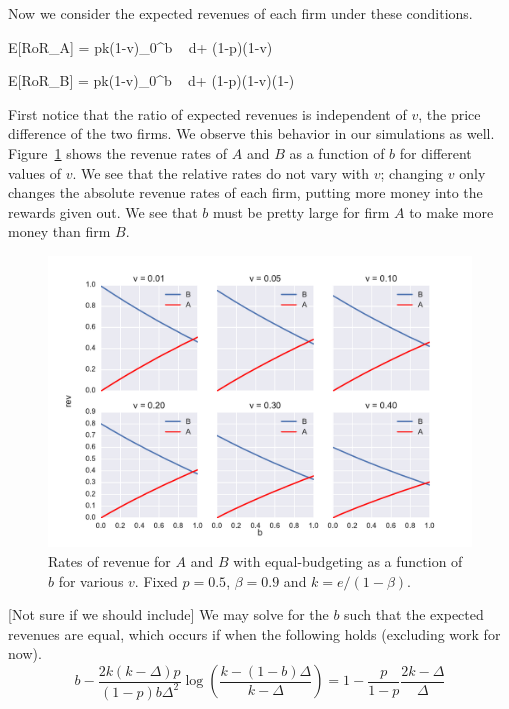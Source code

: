 Now we consider the expected revenues of each firm under these conditions.

\beq
{}E[RoR_A] = pk(1-v)\int_0^b  \mbox{ } d\lambda + (1-p)(1-v)
\eeq

\beq
{}E[RoR_B] = pk(1-v)\int_0^b  \mbox{ } d\lambda + (1-p)(1-v)\left(1-\right)
\eeq

First notice that the ratio of expected revenues is independent of $v$, the price difference of the two firms. We observe this behavior in our simulations as well. Figure~\ref{fig:eq_budg_vary_v} shows the revenue rates of $A$ and $B$ as a function of $b$ for different values of $v$. We see that the relative rates do not vary with $v$; changing $v$ only changes the absolute revenue rates of each firm, putting more money into the rewards given out. We see that $b$ must be pretty large for firm $A$ to make more money than firm $B$. 

\begin{figure}[h!]
\begin{centering}
\includegraphics[scale = 0.75]{./figures/eq_budg_vary_v_p05.pdf}
\caption{Rates of revenue for $A$ and $B$ with equal-budgeting as a function of $b$ for various $v$. Fixed $p = 0.5$, $\beta = 0.9$ and $k = e/(1-\beta)$.}
\label{fig:eq_budg_vary_v}
\end{centering}
\end{figure}

[Not sure if we should include] We may solve for the $b$ such that the expected revenues are equal, which occurs if when the following holds (excluding work for now).
\begin{equation*}
b-\frac{2k(k-\Delta)p}{(1-p)b\Delta^2}\log \left(\frac{k-(1-b)\Delta}{k-\Delta} \right) = 1-\frac{p}{1-p} \frac{2k-\Delta}{\Delta}
\end{equation*}

